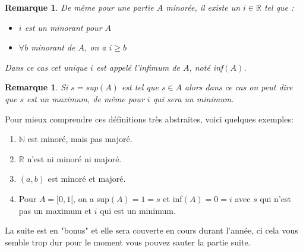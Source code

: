 \documentclass[a4paper, 12pt, french, twoside]{article}
\newtheorem{rem}[theorem]{Remarque}
\newcommand{\Nn}{{\mathbb{N}}}
\newcommand{\Rr}{{\mathbb{R}}}
\begin{document}
\begin{rem}
    De même pour une partie $A$ minorée, il existe un $i\in \Rr$ tel que :
    \begin{itemize}
    \item $i$ est un minorant pour $A$
    \item$\forall b$ minorant de $A$, on a $i\geq b$
\end{itemize}
    Dans ce cas cet unique $i$ est appelé l'infimum de $A$, noté inf$(A)$.
\end{rem}
\begin{rem}
    Si $s=$sup$(A)$ est tel que $s\in A$ alors dans ce cas on peut dire que $s$ est un maximum, de même pour $i$ qui sera un minimum.  
\end{rem}
Pour mieux comprendre ces définitions très abstraites, voici quelques exemples: 
\begin{enumerate}
\item $\Nn$ est minoré, mais pas majoré. 
\item $\Rr$ n'est ni minoré ni majoré. 
\item $(a,b)$ est minoré et majoré. 
    \item Pour $A=[0,1[$, on a sup$(A)=1=s$ et inf$(A)=0=i$ avec $s$ qui n'est pas un maximum et $i$ qui est un minimum. 
\end{enumerate}
La suite est en "bonus" et elle sera couverte en cours durant l'année, ci cela vous semble trop dur pour le moment vous pouvez sauter la partie suite.
\end{document}
